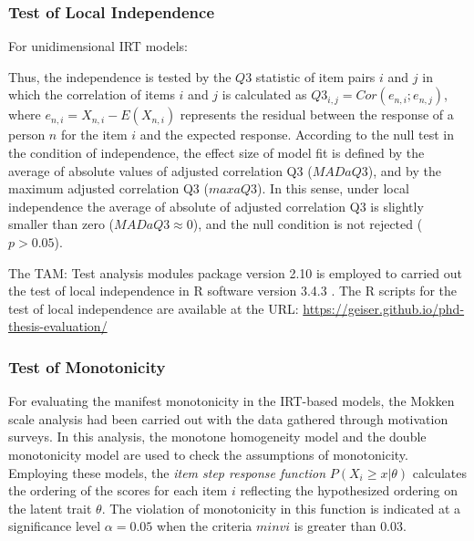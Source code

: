\subsubsection*{Test of Local Independence}

For unidimensional IRT models:

\begin{citacao}
 \cite{HambletonSwaminathanRogers1991}
\end{citacao}

Thus, the independence is tested by the $Q3$ statistic of item pairs $i$ and $j$ in which the correlation of items $i$ and $j$ is calculated as $Q3_{i,j} = Cor(e_{n,i}; e_{n,j})$, where $e_{n,i} = X_{n,i} - E(X_{n,i})$ represents the residual between the response of a person $n$ for the item $i$ and the expected response. According to the null test in the condition of independence, the effect size of model fit is defined by the average of absolute values of adjusted correlation Q3 ($MADaQ3$), and by the maximum adjusted correlation Q3 ($maxaQ3$). In this sense, under local independence the average of absolute of adjusted correlation Q3 is slightly smaller than zero ($MADaQ3 \approx 0$), and the null condition is not rejected ($p > 0.05$).

The TAM: Test analysis modules package version 2.10 \cite{RobitzschKieferWu2018} is employed to carried out the test of local independence in R software version 3.4.3 \cite{RCoreTeam2017}. The R scripts for the test of local independence are available at the URL: \url{https://geiser.github.io/phd-thesis-evaluation/}

\subsubsection*{Test of Monotonicity}

For evaluating the manifest monotonicity in the IRT-based models, the Mokken scale analysis \cite{Mokken1971, VanderArk2007} had been carried out with the data gathered through motivation surveys. In this analysis, the monotone homogeneity model and the double monotonicity model are used to check the assumptions of monotonicity. Employing these models, the \emph{item step response function} $P(X_{i} \geq x | \theta)$ calculates the ordering of the scores for each item $i$ reflecting the hypothesized ordering on the latent trait $\theta$. The violation of monotonicity in this function  is indicated at a significance level $\alpha = 0.05$ when the criteria $minvi$ is greater than $0.03$.

